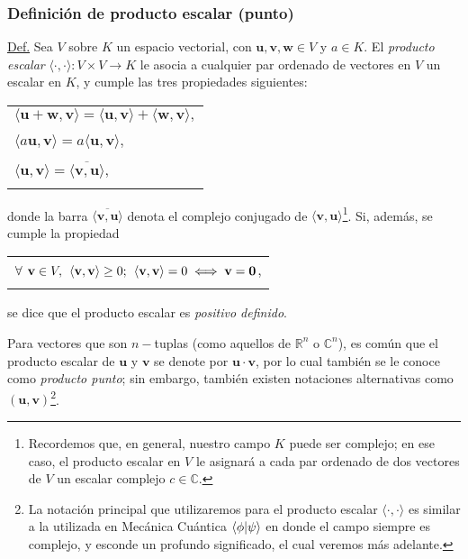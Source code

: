 \documentclass[12pt,dvipsnames]{article}
\begin{document}
\subsubsection{Definición de producto escalar (punto)} \label{Def:Producto_escalar}

\begin{tcolorbox}
\underline{Def.} Sea $V$ sobre $K$ un espacio vectorial, con $\mathbf{u},\mathbf{v},\mathbf{w}\in V$ y $a\in K$. El \textit{producto escalar} $\langle\cdot\mathop ,\cdot\rangle:V\times V\rightarrow K$ le asocia a cualquier par ordenado de vectores en $V$ un escalar en $K$, y cumple las tres propiedades siguientes:

\begin{tabular}{l}
    \\
    $\langle\mathbf{u}+\mathbf{w},\mathbf{v}\rangle = \langle\mathbf{u},\mathbf{v}\rangle+\langle\mathbf{w},\mathbf{v}\rangle,$ \\ \\ $\langle a\mathbf{u},\mathbf{v}\rangle = a\langle\mathbf{u},\mathbf{v}\rangle,$ \\ \\
    $\langle\mathbf{u},\mathbf{v}\rangle=\overline{\langle\mathbf{v},\mathbf{u}\rangle},$ \\ \\
\end{tabular}

donde la barra $\overline{\langle\mathbf{v},\mathbf{u}\rangle}$ denota el complejo conjugado de $\langle\mathbf{v},\mathbf{u}\rangle$\footnote{Recordemos que, en general, nuestro campo $K$ puede ser complejo; en ese caso, el producto escalar en $V$ le asignará a cada par ordenado de dos vectores de $V$ un escalar complejo $c\in\mathbb{C}$.}. Si, además, se cumple la propiedad

\begin{tabular}{l}
    \\
    $\forall\hspace{1.5mm}\mathbf{v}\in V, \hspace{1.5mm} \langle\mathbf{v},\mathbf{v}\rangle\geq0; \hspace{1.5mm} \langle\mathbf{v},\mathbf{v}\rangle = 0 \iff \mathbf{v}=\mathbf{0}$, \\ \\
\end{tabular}

se dice que el producto escalar es \textit{positivo definido}.

\vspace{3mm}
\hspace{2.5mm} Para vectores que son $n-$tuplas (como aquellos de $\mathbb{R}^n$ o $\mathbb{C}^n$), es común que el producto escalar de $\mathbf{u}$ y $\mathbf{v}$ se denote por $\mathbf{u}\cdot\mathbf{v}$, por lo cual también se le conoce como \textit{producto punto}; sin embargo, también existen notaciones alternativas como $(\mathbf{u}, \mathbf{v})$\footnote{La notación principal que utilizaremos para el producto escalar $\langle \cdot,\cdot\rangle$ es similar a la utilizada en Mecánica Cuántica $\braket{\phi|\psi}$ \textemdash en donde el campo siempre es complejo\textemdash, y esconde un profundo significado, el cual veremos más adelante.}.


\end{tcolorbox}
\end{document}
